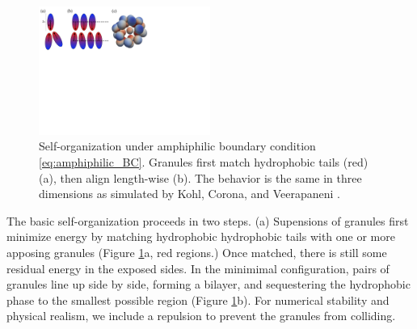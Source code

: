 \begin{figure}
  \vspace{-5pt}
\centerline{\includegraphics[width=0.5\textwidth]{figures/SA1Figures/AmphiphilicAssembly.pdf}}
  \vspace{-5pt}
\caption{\label{fig:amphiphilic_assembly}
Self-organization under amphiphilic boundary condition \eqref{eq:amphiphilic_BC}.
Granules first match hydrophobic tails (red) (a), then align length-wise (b). 
The behavior is the same in three dimensions 
as simulated by Kohl, Corona, and Veerapaneni
\cite{koh-cor-che-vee2021}.}
\end{figure}
The basic self-organization proceeds in two steps.
(a) Supensions of granules first minimize energy by matching hydrophobic
hydrophobic tails with one or more apposing granules
(Figure \ref{fig:amphiphilic_assembly}a, red regions.)
Once matched, there is still some residual energy in the
exposed sides.  In the minimimal configuration, pairs of
granules line up side by side, forming a bilayer,
and sequestering the hydrophobic
phase to the smallest possible region
(Figure \ref{fig:amphiphilic_assembly}b).
For numerical stability and physical realism,
we include a repulsion to prevent the granules from colliding.

